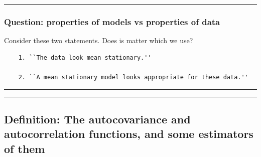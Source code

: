 \documentclass[]{article}
\begin{document}
\begin{center}\rule{0.5\linewidth}{\linethickness}\end{center}

\subsubsection{Question: properties of models vs properties of
data}\label{question-properties-of-models-vs-properties-of-data}

Consider these two statements. Does is matter which we use?

\begin{verbatim}
    1. ``The data look mean stationary.''

    2. ``A mean stationary model looks appropriate for these data.''
\end{verbatim}

\begin{center}\rule{0.5\linewidth}{\linethickness}\end{center}

\begin{center}\rule{0.5\linewidth}{\linethickness}\end{center}

\subsection{Definition: The autocovariance and autocorrelation
functions, and some estimators of
them}\label{definition-the-autocovariance-and-autocorrelation-functions-and-some-estimators-of-them}
\end{document}
